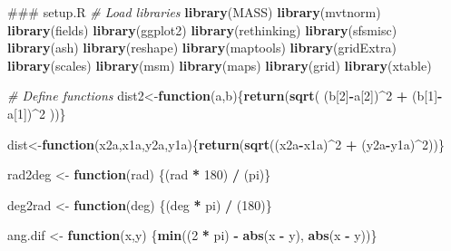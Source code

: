 \documentclass[]{article}
\newenvironment{Shaded}{\begin{snugshade}}{\end{snugshade}}
\newcommand{\KeywordTok}[1]{\textcolor[rgb]{0.13,0.29,0.53}{\textbf{#1}}}
\newcommand{\DecValTok}[1]{\textcolor[rgb]{0.00,0.00,0.81}{#1}}
\newcommand{\StringTok}[1]{\textcolor[rgb]{0.31,0.60,0.02}{#1}}
\newcommand{\CommentTok}[1]{\textcolor[rgb]{0.56,0.35,0.01}{\textit{#1}}}
\newcommand{\ControlFlowTok}[1]{\textcolor[rgb]{0.13,0.29,0.53}{\textbf{#1}}}
\newcommand{\OperatorTok}[1]{\textcolor[rgb]{0.81,0.36,0.00}{\textbf{#1}}}
\newcommand{\NormalTok}[1]{#1}
\begin{document}
\begin{Shaded}
\begin{Highlighting}[]
{\NormalTok{### setup.R}
\CommentTok{# Load libraries}
     \KeywordTok{library}\NormalTok{(MASS)}
     \KeywordTok{library}\NormalTok{(mvtnorm)}
     \KeywordTok{library}\NormalTok{(fields)}
     \KeywordTok{library}\NormalTok{(ggplot2)}
     \KeywordTok{library}\NormalTok{(rethinking)  }
     \KeywordTok{library}\NormalTok{(sfsmisc)}
     \KeywordTok{library}\NormalTok{(ash)}
     \KeywordTok{library}\NormalTok{(reshape)}
     \KeywordTok{library}\NormalTok{(maptools)}
     \KeywordTok{library}\NormalTok{(gridExtra)}
     \KeywordTok{library}\NormalTok{(scales)}
     \KeywordTok{library}\NormalTok{(msm)}
     \KeywordTok{library}\NormalTok{(maps)}
     \KeywordTok{library}\NormalTok{(grid)}
     \KeywordTok{library}\NormalTok{(xtable)}
    
    \CommentTok{# Define functions}
\NormalTok{     dist2<-}\ControlFlowTok{function}\NormalTok{(a,b)\{}\KeywordTok{return}\NormalTok{(}\KeywordTok{sqrt}\NormalTok{( (b[}\DecValTok{2}\NormalTok{]}\OperatorTok{-}\NormalTok{a[}\DecValTok{2}\NormalTok{])}\OperatorTok{^}\DecValTok{2}   \OperatorTok{+}\StringTok{ }\NormalTok{(b[}\DecValTok{1}\NormalTok{]}\OperatorTok{-}\NormalTok{a[}\DecValTok{1}\NormalTok{])}\OperatorTok{^}\DecValTok{2}\NormalTok{ ))\}  }
    
\NormalTok{     dist<-}\ControlFlowTok{function}\NormalTok{(x2a,x1a,y2a,y1a)\{}\KeywordTok{return}\NormalTok{(}\KeywordTok{sqrt}\NormalTok{((x2a}\OperatorTok{-}\NormalTok{x1a)}\OperatorTok{^}\DecValTok{2} \OperatorTok{+}\StringTok{ }\NormalTok{(y2a}\OperatorTok{-}\NormalTok{y1a)}\OperatorTok{^}\DecValTok{2}\NormalTok{))\}  }
    
\NormalTok{     rad2deg <-}\StringTok{ }\ControlFlowTok{function}\NormalTok{(rad) \{(rad }\OperatorTok{*}\StringTok{ }\DecValTok{180}\NormalTok{) }\OperatorTok{/}\StringTok{ }\NormalTok{(pi)\}}
    
\NormalTok{     deg2rad <-}\StringTok{ }\ControlFlowTok{function}\NormalTok{(deg) \{(deg }\OperatorTok{*}\StringTok{ }\NormalTok{pi) }\OperatorTok{/}\StringTok{ }\NormalTok{(}\DecValTok{180}\NormalTok{)\}}
    
\NormalTok{     ang.dif <-}\StringTok{ }\ControlFlowTok{function}\NormalTok{(x,y) \{}\KeywordTok{min}\NormalTok{((}\DecValTok{2} \OperatorTok{*}\StringTok{ }\NormalTok{pi) }\OperatorTok{-}\StringTok{ }\KeywordTok{abs}\NormalTok{(x }\OperatorTok{-}\StringTok{ }\NormalTok{y), }\KeywordTok{abs}\NormalTok{(x }\OperatorTok{-}\StringTok{ }\NormalTok{y))\}}
    
}
\end{Highlighting}
\end{Shaded}
\end{document}
